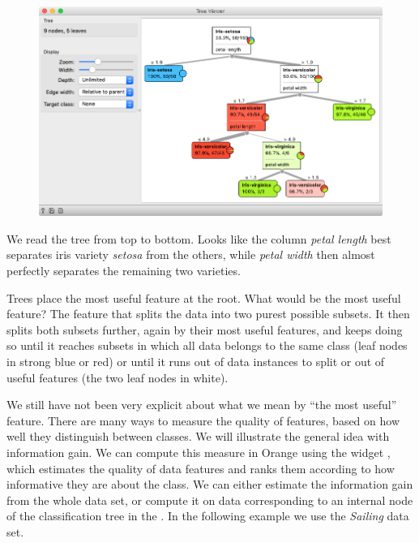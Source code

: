 \begin{figure}
    \includegraphics[scale=0.35]{graphics/ch-classification_trees/tree-viewer.png}
    \label{fig:classification-predictions}
\end{figure}

We read the tree from top to bottom. Looks like the column \textit{petal length} best separates iris variety \textit{setosa} from the others, while \textit{petal width} then almost perfectly separates the remaining two varieties.

Trees place the most useful feature at the root. What would be the most useful feature? The feature that splits the data into two purest possible subsets. It then splits both subsets further, again by their most useful features, and keeps doing so until it reaches subsets in which all data belongs to the same class (leaf nodes in strong blue or red) or until it runs out of data instances to split or out of useful features (the two leaf nodes in white).

We still have not been very explicit about what we mean by ``the most useful'' feature. There are many ways to measure the quality of features, based on how well they distinguish between classes. We will illustrate the general idea with information gain. We can compute this measure in Orange using the  widget , which estimates the quality of data features and ranks them according to how informative they are about the class. We can either estimate the information gain from the whole data set, or compute it on data corresponding to an internal node of the classification tree in the . In the following example we use the \textit{Sailing} data set.

